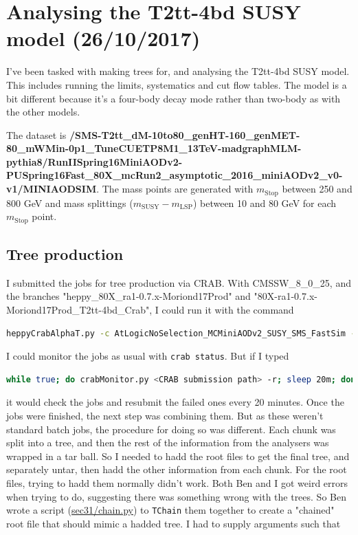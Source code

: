 \newpage
\section{Analysing the T2tt-4bd SUSY model (26/10/2017)}

I've been tasked with making trees for, and analysing the T2tt-4bd SUSY model. This includes running the limits, systematics and cut flow tables. The model is a bit different because it's a four-body decay mode rather than two-body as with the other models.

The dataset is \textbf{/SMS-T2tt\_dM-10to80\_genHT-160\_genMET-80\_mWMin-0p1\_TuneCUETP8M1\_13TeV-madgraphMLM-pythia8/RunIISpring16MiniAODv2-PUSpring16Fast\_80X\_mcRun2\_asymptotic\_2016\_miniAODv2\_v0-v1/MINIAODSIM}. The mass points are generated with $m_{\mathrm{Stop}}$ between 250 and 800 GeV and mass splittings ($m_{\mathrm{SUSY}} - m_{\mathrm{LSP}}$) between 10 and 80 GeV for each $m_{\mathrm{Stop}}$ point.


\subsection{Tree production}

I submitted the jobs for tree production via CRAB. With CMSSW\_8\_0\_25, and the branches "heppy\_80X\_ra1-0.7.x-Moriond17Prod" and "80X-ra1-0.7.x-Moriond17Prod\_T2tt-4bd\_Crab", I could run it with the command

\begin{lstlisting}[belowskip=-0.7cm, language=sh, numbers=none]
heppyCrabAlphaT.py -c AtLogicNoSelection_MCMiniAODv2_SUSY_SMS_FastSim -d RA1 -s T2_UK_SGrid_Bristol
\end{lstlisting}

I could monitor the jobs as usual with \texttt{crab status}. But if I typed

\begin{lstlisting}[belowskip=-0.7cm, language=sh, numbers=none]
while true; do crabMonitor.py <CRAB submission path> -r; sleep 20m; done
\end{lstlisting}

it would check the jobs and resubmit the failed ones every 20 minutes. Once the jobs were finished, the next step was combining them. But as these weren't standard batch jobs, the procedure for doing so was different. Each chunk was split into a tree, and then the rest of the information from the analysers was wrapped in a tar ball. So I needed to hadd the root files to get the final tree, and separately untar, then hadd the other information from each chunk. For the root files, trying to hadd them normally didn't work. Both Ben and I got weird errors when trying to do, suggesting there was something wrong with the trees. So Ben wrote a script (\href{run:sec31/chain.py}{sec31/chain.py}) to \texttt{TChain} them together to create a "chained" root file that should mimic a hadded tree. I had to supply arguments such that

